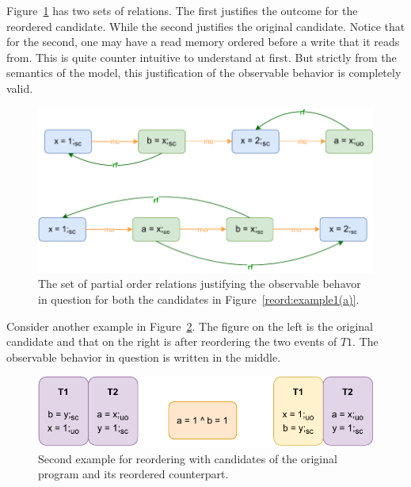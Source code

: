         Figure~\ref{reord:example1(b)} has two sets of relations. 
        The first justifies the outcome for the reordered candidate. 
        While the second justifies the original candidate. 
        Notice that for the second, one may have a read memory ordered before a write that it reads from. 
        This is quite counter intuitive to understand at first. 
        But strictly from the semantics of the model, this justification of the observable behavior is completely valid. 
        \begin{figure}[H]
            \centering
            \includegraphics[scale=0.7]{5.InstructionReordering/0.Intro/ReorderingExample1(b).pdf}
            \caption{The set of partial order relations justifying the observable behavor in question for both the candidates in Figure~\ref{reord:example1(a)}.} 
            \label{reord:example1(b)}
        \end{figure}

        
        Consider another example in Figure~\ref{reord:example2(a)}.
        The figure on the left is the original candidate and that on the right is after reordering the two events of $T1$.
        The observable behavior in question is written in the middle. 
        \begin{figure}[H]
            \centering
            \includegraphics[scale=0.7]{5.InstructionReordering/0.Intro/ReorderingExample2(a).pdf}
            \caption{Second example for reordering with candidates of the original program and its reordered counterpart.} 
            \label{reord:example2(a)}
        \end{figure}


